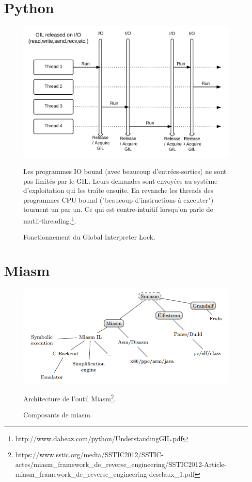 \chapter{Python}
\begin{figure}[h]
    \centering
    \includegraphics[scale=0.5]{images/GIL.png}
    \caption{Fonctionnement du Global Interpreter Lock.}
    Les programmes IO bound (avec beaucoup d'entrées-sorties) ne sont pas limités par le GIL. Leurs demandes sont envoyées au système d'exploitation qui les traîte ensuite. En revanche les threads des programmes CPU bound ("beaucoup d'instructions à executer") tournent un par un. Ce qui est contre-intuitif lorsqu'on parle de mutli-threading.\footnote{http://www.dabeaz.com/python/UnderstandingGIL.pdf}.
\end{figure}

\chapter{Miasm}
\begin{figure}[h]
    \centering
    \includegraphics[scale=0.5]{images/miasm-orga.png}
    \caption{Composants de miasm.}
    Architecture de l'outil Miasm\footnote{https://www.sstic.org/media/SSTIC2012/SSTIC-actes/miasm\_framework\_de\_reverse\_engineering/SSTIC2012-Article-miasm\_framework\_de\_reverse\_engineering-desclaux\_1.pdf}.
\end{figure}
